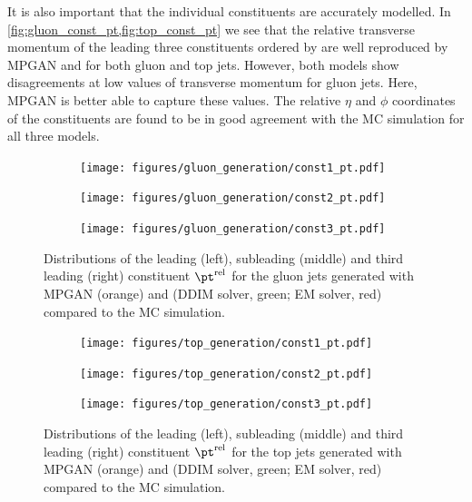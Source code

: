 It is also important that the individual constituents are accurately modelled.
In \cref{fig:gluon_const_pt,fig:top_const_pt} we see that the relative transverse momentum of the leading three constituents ordered by \pt are well reproduced by MPGAN and \pcjedi for both gluon and top jets.
However, both \pcjedi models show disagreements at low values of transverse momentum for gluon jets.
Here, MPGAN is better able to capture these values.
The relative $\eta$ and $\phi$ coordinates of the constituents are found to be in good agreement with the MC simulation for all three models.

\begin{figure}[hbpt]
    \begin{subfigure}{.33\textwidth}
        \centering
        \texttt{[image: figures/gluon\_generation/const1\_pt.pdf]}
    \end{subfigure}%
    \begin{subfigure}{.33\textwidth}
        \centering
        \texttt{[image: figures/gluon\_generation/const2\_pt.pdf]}
    \end{subfigure}%
    \begin{subfigure}{.33\textwidth}
        \centering
        \texttt{[image: figures/gluon\_generation/const3\_pt.pdf]}
    \end{subfigure}%
    \caption{Distributions of the leading (left), subleading (middle) and third leading (right) constituent $\pt^\text{rel}$ for the gluon jets generated with MPGAN (orange) and \pcjedi (DDIM solver, green; EM solver, red) compared to the MC simulation.}
    \label{fig:gluon_const_pt}
\end{figure}

\begin{figure}[hbpt]
    \begin{subfigure}{.33\textwidth}
        \centering
        \texttt{[image: figures/top\_generation/const1\_pt.pdf]}
    \end{subfigure}%
    \begin{subfigure}{.33\textwidth}
        \centering
        \texttt{[image: figures/top\_generation/const2\_pt.pdf]}
    \end{subfigure}%
    \begin{subfigure}{.33\textwidth}
        \centering
        \texttt{[image: figures/top\_generation/const3\_pt.pdf]}
    \end{subfigure}%
    \caption{Distributions of the leading (left), subleading (middle) and third leading (right) constituent $\pt^\text{rel}$ for the top jets generated with MPGAN (orange) and \pcjedi (DDIM solver, green; EM solver, red) compared to the MC simulation.}
    \label{fig:top_const_pt}
\end{figure}

